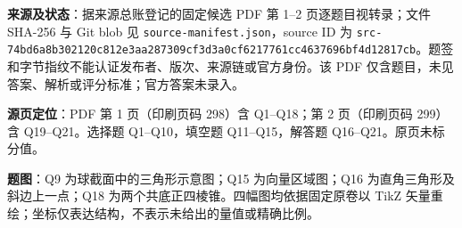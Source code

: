 

\begin{gktip}
\textbf{来源及状态}：据来源总账登记的固定候选 PDF 第 1–2 页逐题目视转录；文件 SHA-256 与 Git blob 见 \texttt{source-manifest.json}，source ID 为 \texttt{src-74bd6a8b302120c812e3aa287309cf3d3a0cf6217761cc4637696bf4d12817cb}。题签和字节指纹不能认证发布者、版次、来源链或官方身份。该 PDF 仅含题目，未见答案、解析或评分标准；官方答案未录入。

\textbf{源页定位}：PDF 第 1 页（印刷页码 298）含 Q1–Q18；第 2 页（印刷页码 299）含 Q19–Q21。选择题 Q1–Q10，填空题 Q11–Q15，解答题 Q16–Q21。原页未标分值。

\textbf{题图}：Q9 为球截面中的三角形示意图；Q15 为向量区域图；Q16 为直角三角形及斜边上一点；Q18 为两个共底正四棱锥。四幅图均依据固定原卷以 TikZ 矢量重绘；坐标仅表达结构，不表示未给出的量值或精确比例。
\end{gktip}



